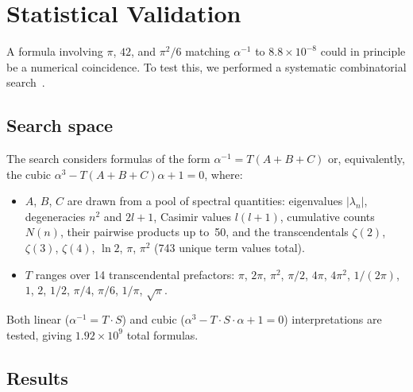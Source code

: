 \documentclass[aps,prl,twocolumn,superscriptaddress]{revtex4-2}
\begin{document}

\section{Statistical Validation}\label{sec:statistical}

A formula involving $\pi$, $42$, and $\pi^2/6$ matching $\alpha^{-1}$
to $8.8 \times 10^{-8}$ could in principle be a numerical
coincidence. To test this, we performed a systematic combinatorial
search~\cite{phase2_audit}.

\subsection{Search space}

The search considers formulas of the form $\alpha^{-1} = T(A + B + C)$
or, equivalently, the cubic $\alpha^3 - T(A+B+C)\alpha + 1 = 0$,
where:
\begin{itemize}
\item $A$, $B$, $C$ are drawn from a pool of spectral quantities:
  eigenvalues $|\lambda_n|$, degeneracies $n^2$ and $2l+1$, Casimir
  values $l(l+1)$, cumulative counts $N(n)$, their pairwise products
  up to~50, and the transcendentals $\zeta(2)$, $\zeta(3)$, $\zeta(4)$,
  $\ln 2$, $\pi$, $\pi^2$ (743 unique term values total).
\item $T$ ranges over 14 transcendental prefactors: $\pi$, $2\pi$,
  $\pi^2$, $\pi/2$, $4\pi$, $4\pi^2$, $1/(2\pi)$, $1$, $2$,
  $1/2$, $\pi/4$, $\pi/6$, $1/\pi$, $\sqrt{\pi}$.
\end{itemize}

Both linear ($\alpha^{-1} = T \cdot S$) and cubic
($\alpha^3 - T \cdot S \cdot \alpha + 1 = 0$) interpretations are
tested, giving $1.92 \times 10^9$ total formulas.

\subsection{Results}
\end{document}

